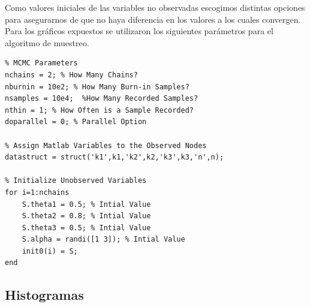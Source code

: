 Como valores iniciales de las variables no observadas escogimos distintas opciones para asegurarnos de que no haya diferencia en los valores a los cuales convergen. Para los gráficos expuestos se utilizaron los siguientes parámetros para el algoritmo de muestreo.

\begin{lstlisting}[frame=single]
% Sampling
% MCMC Parameters
nchains = 2; % How Many Chains?
nburnin = 10e2; % How Many Burn-in Samples?
nsamples = 10e4;  %How Many Recorded Samples?
nthin = 1; % How Often is a Sample Recorded?
doparallel = 0; % Parallel Option

% Assign Matlab Variables to the Observed Nodes
datastruct = struct('k1',k1,'k2',k2,'k3',k3,'n',n);

% Initialize Unobserved Variables
for i=1:nchains
    S.theta1 = 0.5; % Intial Value
    S.theta2 = 0.8; % Intial Value
    S.theta3 = 0.5; % Intial Value
    S.alpha = randi([1 3]); % Intial Value
    init0(i) = S;
end

\end{lstlisting}

\subsection{Histogramas}

